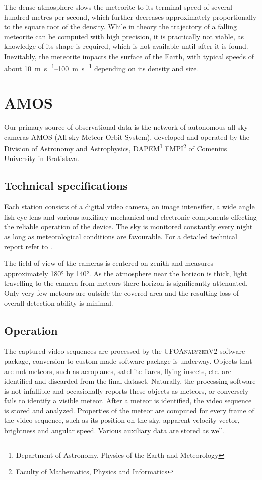         The dense atmosphere slows the meteorite to its terminal speed of several hundred metres per second,
        which further decreases approximately proportionally to the square root of the density.
        While in theory the trajectory of a falling meteorite can be computed with high precision,
        it is practically not viable, as knowledge of its shape is required, which is not available
        until after it is found.
        Inevitably, the meteorite impacts the surface of the Earth,
        with typical speeds of about \SIrange{10}{100}{\metre\per\second} depending on its density and size.

\section{AMOS} \label{iA}
    Our primary source of observational data is the network of autonomous all-sky cameras AMOS (All-sky Meteor Orbit System),
    developed and operated by the Division of Astronomy and Astrophysics,
    DAPEM\footnote{Department of Astronomy, Physics of the Earth and Meteorology}
    FMPI\footnote{Faculty of Mathematics, Physics and Informatics} of Comenius University in Bratislava.

    \subsection{Technical specifications} \label{iAt}
        Each station consists of a digital video camera, an image intensifier, a wide angle fish-eye lens
        and various auxiliary mechanical and electronic components effecting
        the reliable operation of the device. The sky is monitored constantly every night
        as long as meteorological conditions are favourable. For a detailed technical report refer to \citet{zigo+2013,toth+2015}.

        The field of view of the cameras is centered on zenith and measures approximately \ang{180} by \ang{140}.
        As the atmosphere near the horizon is thick, light travelling to the camera from meteors there horizon is significantly attenuated.
        Only very few meteors are outside the covered area and the resulting loss of overall detection ability is minimal.

    \subsection{Operation} \label{iAo}
        The captured video sequences are processed by the \textsc{UFOAnalyzerV2} software package,
        conversion to custom-made software package is underway.
        Objects that are not meteors, such as aeroplanes, satellite flares, flying insects, etc.
        are identified and discarded from the final dataset. Naturally, the processing software is not
        infallible and occasionally reports these objects as meteors, or conversely fails to identify a visible meteor.
        After a meteor is identified, the video sequence is stored and analyzed.
        Properties of the meteor are computed for every frame of the video sequence,
        such as its position on the sky, apparent velocity vector, brightness and angular speed.
        Various auxiliary data are stored as well.

